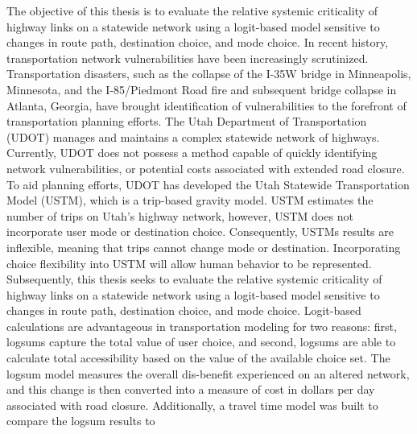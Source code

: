 \afterpage{\cleardoublepage}


The objective of this thesis is to evaluate the relative systemic
criticality of highway links on a statewide network using a logit-based model
sensitive to changes in route path, destination choice, and mode choice.
In recent history, transportation network vulnerabilities have been increasingly
scrutinized. Transportation disasters, such as the collapse of the I-35W
bridge in Minneapolis, Minnesota, and the I-85/Piedmont Road fire
and subsequent bridge collapse in Atlanta, Georgia, have brought identification of
vulnerabilities to the forefront of transportation planning efforts.
The Utah Department of Transportation (UDOT) manages and maintains a complex statewide network of highways.
Currently, UDOT does not possess a method capable of quickly identifying network
vulnerabilities, or potential costs associated with extended road closure.
To aid planning efforts, UDOT has developed the Utah
Statewide Transportation Model (USTM), which is a trip-based gravity model. USTM
estimates the number of trips on Utah's highway network, however, USTM does not
incorporate user mode or destination choice.
Consequently, USTMs results are inflexible, meaning that trips cannot change mode or destination.
Incorporating choice flexibility into USTM will allow human behavior to be represented.
Subsequently, this thesis seeks to evaluate the relative systemic
criticality of highway links on a statewide network using a logit-based model
sensitive to changes in route path, destination choice, and mode choice.
Logit-based calculations are advantageous in transportation modeling for two reasons: first,
logsums capture the total value of user choice, and second, logsums are able to calculate
total accessibility based on the value of the available choice set. The logsum model measures the overall
dis-benefit experienced on an altered network, and this change is then
converted into a measure of cost in dollars per day associated with
road closure.
Additionally, a travel time model was built to compare the logsum results to
